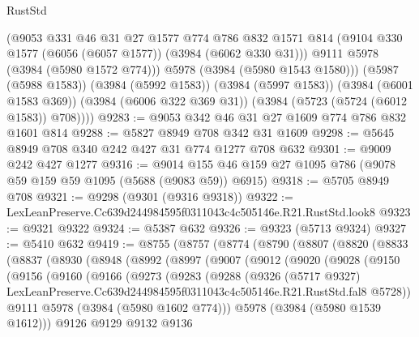 \begin{lexlean}{RustStd}
\begin{coremodule}
          (@9053
            @331
            @46
            @31
            @27
            @1577
            @774
            @786
            @832
            @1571
            @814
            (@9104 @330 @1577 (@6056 (@6057 @1577)) (@3984 (@6062 @330 @31)))
            @9111
            @5978
            (@3984 (@5980 @1572 @774)))
          @5978
          (@3984 (@5980 @1543 @1580)))
        (@5987 (@5988 @1583))
        (@3984 (@5992 @1583))
        (@3984 (@5997 @1583))
        (@3984 (@6001 @1583 @369))
        (@3984 (@6006 @322 @369 @31))
        (@3984 (@5723 (@5724 (@6012 @1583)) @708))))
@9283 := @9053 @342 @46 @31 @27 @1609 @774 @786 @832 @1601 @814
@9288 := @5827 @8949 @708 @342 @31 @1609
@9298 := @5645 @8949 @708 @340 @242 @427 @31 @774 @1277 @708 @632
@9301 := @9009 @242 @427 @1277
@9316 := @9014 @155 @46 @159 @27 @1095 @786 (@9078 @59 @159 @59 @1095 (@5688 (@9083 @59)) @6915)
@9318 := @5705 @8949 @708
@9321 := @9298 (@9301 (@9316 @9318))
@9322 := LexLeanPreserve.Cc639d244984595f0311043c4c505146e.R21.RustStd.look8
@9323 := @9321 @9322
@9324 := @5387 @632
@9326 := @9323 (@5713 @9324)
@9327 := @5410 @632
@9419 := @8755
    (@8757
      (@8774
        (@8790
          (@8807
            (@8820
              (@8833
                (@8837
                  (@8930
                    (@8948
                      (@8992
                        (@8997
                          (@9007
                            (@9012
                              (@9020
                                (@9028
                                  (@9150
                                    (@9156
                                      (@9160
                                        (@9166
                                          (@9273
                                            (@9283
                                              (@9288
                                                (@9326
                                                  (@5717 @9327)
                                                  LexLeanPreserve.Cc639d244984595f0311043c4c505146e.R21.RustStd.fal8
                                                  @5728))
                                              @9111
                                              @5978
                                              (@3984 (@5980 @1602 @774)))
                                            @5978
                                            (@3984 (@5980 @1539 @1612)))
                                          @9126
                                          @9129
                                          @9132
                                          @9136

\end{coremodule}
\end{lexlean}
